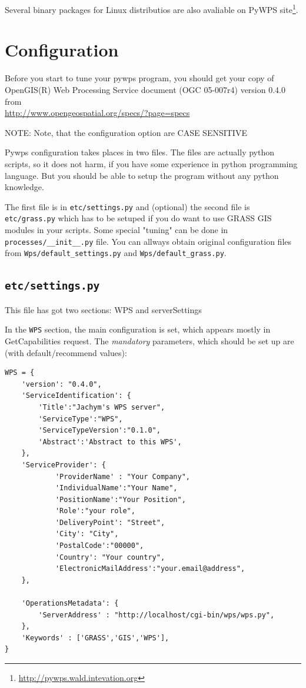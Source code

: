\documentclass[a4paper,11pt]{article}
\newcommand{\pywpssite}{\url{http://pywps.wald.intevation.org}}
\newcommand{\note}[1]{\medskip{}\noindent{}NOTE: #1\medskip{}}
\begin{document}
Several binary packages for Linux distributios are also avaliable on PyWPS
site\footnote{\pywpssite}.

\section{Configuration}
\label{configuration}
    
Before you start to tune your pywps program, you should get your copy of
OpenGIS(R) Web Processing Service document (OGC 05-007r4) version 0.4.0
from\\ \url{http://www.opengeospatial.org/specs/?page=specs}
    
\note{Note, that the configuration option are CASE SENSITIVE}
    
Pywps configuration takes places in two files. The files are actually python
scripts, so it does not harm, if you have some experience in python
programming language. But you should be able to setup the program without
any python knowledge.

The first file is in \texttt{etc/settings.py} and (optional) the second file is
\texttt{etc/grass.py} which has to be setuped if you do want to use
GRASS GIS modules in your scripts. Some special "tuning" can be done in \texttt{processes/\_\_init\_\_.py}
file. You can allways obtain original configuration files from
\texttt{Wps/default\_settings.py} and \texttt{Wps/default\_grass.py}.
    
\subsection{\texttt{etc/settings.py}}
    
This file has got two sections: WPS and serverSettings
    
In the \texttt{WPS} section, the main configuration is set, which appears mostly in
GetCapabilities request. The \emph{mandatory} parameters, which should be set up
are (with default/recommend values):
    

\begin{verbatim}
WPS = {
    'version': "0.4.0",
    'ServiceIdentification': {
        'Title':"Jachym's WPS server",
        'ServiceType':"WPS",
        'ServiceTypeVersion':"0.1.0",
        'Abstract':'Abstract to this WPS',
    },
    'ServiceProvider': {
            'ProviderName' : "Your Company",
            'IndividualName':"Your Name",
            'PositionName':"Your Position",
            'Role':"your role",
            'DeliveryPoint': "Street",
            'City': "City",
            'PostalCode':"00000",
            'Country': "Your country",
            'ElectronicMailAddress':"your.email@address",
    },

    'OperationsMetadata': {
        'ServerAddress' : "http://localhost/cgi-bin/wps/wps.py",
    },
    'Keywords' : ['GRASS','GIS','WPS'],
}
\end{verbatim}
\end{document}
